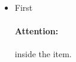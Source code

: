 \documentclass{article}
\begin{document}
\begin{itemize}
\item First
\paragraph{Attention:} inside the item.
\end{itemize}
\end{document}
